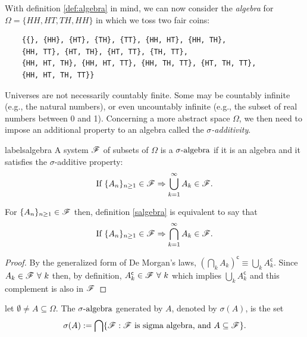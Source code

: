 \documentclass[../TGMAFFIRO.tex]{subfiles}
\begin{document}
With definition \ref{def:algebra} in mind, we can now consider the \textit{algebra} for $\Omega = \{HH, HT, TH, HH\}$ in which we toss two fair coins:

\begin{verbatim}
	{{}, {HH}, {HT}, {TH}, {TT}, {HH, HT}, {HH, TH},
	{HH, TT}, {HT, TH}, {HT, TT}, {TH, TT},
	{HH, HT, TH}, {HH, HT, TT}, {HH, TH, TT}, {HT, TH, TT},
	{HH, HT, TH, TT}}
\end{verbatim}

Universes are not necessarily countably finite. Some may be countably infinite (e.g., the natural numbers), or even uncountably infinite (e.g., the subset of real numbers between 0 and 1). Concerning a more abstract space $\Omega$, we then need to impose an additional property to an algebra called the \textit{$\sigma$-additivity}.

\begin{definition}[\textbf{$\salg$}]label{salgebra}
	A system $\mathscr{F}$ of subsets of $\Omega$ is a $\salg$ if it is an algebra and it satisfies the $\sigma$-additive property:
	\begin{equation*}
		\text{If } \{A_n\}_{n\geq 1} \in \mathscr{F} \Rightarrow \bigcup_{k=1}^{\infty} A_k \in \mathscr{F}.
	\end{equation*}
\end{definition}

\begin{remark}
	For $\{A_n\}_{n\geq 1} \in \mathscr{F}$ then, definition \ref{salgebra} is equivalent to say that
	\begin{equation*}
		\text{If } \{A_n\}_{n\geq 1} \in \mathscr{F} \Rightarrow \bigcap_{k=1}^{\infty} A_k \in \mathscr{F}.
	\end{equation*}
\end{remark}

\begin{proof}
	By the generalized form of De Morgan's laws, $(\bigcap_k A_k)^\mathsf{c} \equiv \bigcup_k A_k^\mathsf{c}$. Since $A_k \in \mathscr{F} \ \forall \ k$ then, by definition,  $A_k^\mathsf{c} \in \mathscr{F} \ \forall \ k$ which implies  $\bigcup_k A_k^\mathsf{c}$ and this complement is also in $\mathscr{F}$
\end{proof}

\begin{definition}\label{generated_sigma_algebra}
	let $\emptyset \neq A \subseteq \Omega$. The $\salg$ generated by $A$, denoted by $\sigma(A)$, is the set
	\begin{equation}
		\sigma(A) := \bigcap\{\mathscr{F} : \mathscr{F} \text{ is sigma algebra, and } A \subseteq \mathscr{F} \}.
	\end{equation}

\end{definition}
\end{document}
